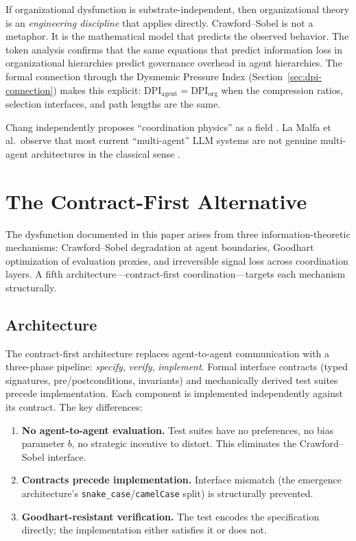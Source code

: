 \documentclass[11pt,a4paper]{article}
\begin{document}
If organizational dysfunction is substrate-independent, then organizational theory is an \emph{engineering discipline} that applies directly. Crawford--Sobel is not a metaphor. It is the mathematical model that predicts the observed behavior. The token analysis confirms that the same equations that predict information loss in organizational hierarchies predict governance overhead in agent hierarchies. The formal connection through the Dysmemic Pressure Index (Section~\ref{sec:dpi-connection}) makes this explicit: $\text{DPI}_{\text{agent}} = \text{DPI}_{\text{org}}$ when the compression ratios, selection interfaces, and path lengths are the same.

Chang independently proposes ``coordination physics'' as a field \citep{chang2025}. La Malfa et al.\ observe that most current ``multi-agent'' LLM systems are not genuine multi-agent architectures in the classical sense \citep{lamalfa2025}.


\section{The Contract-First Alternative}
\label{sec:alternative}

The dysfunction documented in this paper arises from three information-theoretic mechanisms: Crawford--Sobel degradation at agent boundaries, Goodhart optimization of evaluation proxies, and irreversible signal loss across coordination layers. A fifth architecture---contract-first coordination---targets each mechanism structurally.

\subsection{Architecture}

The contract-first architecture replaces agent-to-agent communication with a three-phase pipeline: \emph{specify}, \emph{verify}, \emph{implement}. Formal interface contracts (typed signatures, pre/postconditions, invariants) and mechanically derived test suites precede implementation. Each component is implemented independently against its contract. The key differences:

\begin{enumerate}
\item \textbf{No agent-to-agent evaluation.} Test suites have no preferences, no bias parameter $b$, no strategic incentive to distort. This eliminates the Crawford--Sobel interface.

\item \textbf{Contracts precede implementation.} Interface mismatch (the emergence architecture's \texttt{snake\_case}/\texttt{camelCase} split) is structurally prevented.

\item \textbf{Goodhart-resistant verification.} The test encodes the specification directly; the implementation either satisfies it or does not.
\end{enumerate}
\end{document}
